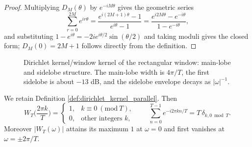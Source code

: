 \begin{proof}
Multiplying $D_M(\theta)$ by $e^{-iM\theta}$ gives the geometric series
\[
\sum_{r=0}^{2M}e^{ir\theta}=\frac{e^{i(2M+1)\theta}-1}{e^{i\theta}-1}
=\frac{e^{i2M\theta}-e^{-i\theta}}{1-e^{-i\theta}} ,
\]
and substituting $1-e^{i\theta}=-2ie^{i\theta/2}\sin(\theta/2)$ and taking moduli gives the closed form; $D_M(0)=2M+1$ follows directly from the definition.
\end{proof}

\begin{figure}[htbp]
\centering
{}
\caption{Dirichlet kernel/window kernel of the rectangular window: main-lobe and sidelobe structure. The main-lobe width is $4\pi/T$, the first sidelobe is about $-13$ dB, and the sidelobe envelope decays as $|\omega|^{-1}$.}
\label{fig:dirichlet_kernel}
\end{figure}

\begin{lemma}\label{lem:window_kernel_orthogonality_parallel}
We retain Definition \ref{def:dirichlet_kernel_parallel}. Then
\[
W_T\Big(\frac{2\pi k}{T}\Big)=\begin{cases}1, & k\equiv0\ (\mathrm{mod}\ T),\\[2pt]0, & \text{other integers }k,\end{cases}
\qquad
\sum_{n=0}^{T-1}e^{-i2\pi kn/T}=T\,\delta_{k,0\bmod T}.
\]
Moreover $|W_T(\omega)|$ attains its maximum $1$ at $\omega=0$ and first vanishes at $\omega=\pm2\pi/T$.
\end{lemma}


